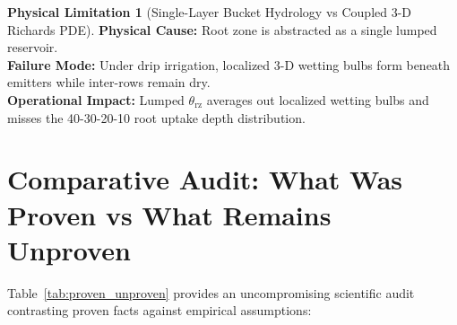 \documentclass[11pt,a4paper]{article}
\theoremstyle{definition}
\newtheorem{limitation}{Physical Limitation}[section]
\theoremstyle{remark}
\begin{document}
\begin{limitation}[Single-Layer Bucket Hydrology vs Coupled 3-D Richards PDE]
\textbf{Physical Cause:} Root zone is abstracted as a single lumped reservoir. \\
\textbf{Failure Mode:} Under drip irrigation, localized 3-D wetting bulbs form beneath emitters while inter-rows remain dry. \\
\textbf{Operational Impact:} Lumped $\theta_{\text{rz}}$ averages out localized wetting bulbs and misses the 40-30-20-10 root uptake depth distribution.
\end{limitation}


\section{Comparative Audit: What Was Proven vs What Remains Unproven}

Table~\ref{tab:proven_unproven} provides an uncompromising scientific audit contrasting proven facts against empirical assumptions:
\end{document}
